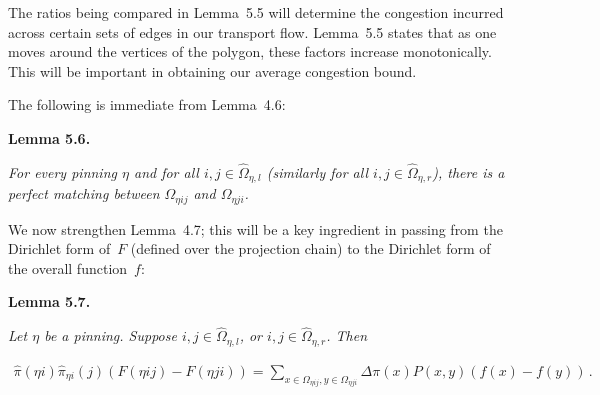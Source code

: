 The ratios being compared in Lemma 5.5 will determine the congestion incurred across certain sets of edges in our transport flow. Lemma 5.5 states that as one moves around the vertices of the polygon, these factors increase monotonically. This will be important in obtaining our average congestion bound.\par




The following is immediate from Lemma 4.6:\par





\par\medskip\noindent\textbf{\textbf{Lemma 5.6}\textbf{.}}\par



\emph{For every pinning $\eta$ and for all $i,j\in\hat{\Omega}_{\eta,l}$ (similarly for all $i,j\in\hat{\Omega}_{\eta,r}$), there is a perfect matching between $\Omega_{\eta ij}$ and $\Omega_{\eta ji}$.}\par






We now strengthen Lemma 4.7; this will be a key ingredient in passing from the Dirichlet form of $F$ (defined over the projection chain) to the Dirichlet form of the overall function $f$:\par





\par\medskip\noindent\textbf{\textbf{Lemma 5.7}\textbf{.}}\par



\emph{Let $\eta$ be a pinning. Suppose $i,j\in\hat{\Omega}_{\eta,l}$, or $i,j\in\hat{\Omega}_{\eta,r}$. Then}\par


\[\begin{gathered}
\displaystyle\hat{\pi}(\eta i)\hat{\pi}_{\eta i}(j)(F(\eta ij)-F(\eta ji)) \displaystyle=\sum_{x\in\Omega_{\eta ij},y\in\Omega_{\eta ji}}\Delta\pi(x)P(x,y)(f(x)-f(y))\,.
\end{gathered}\]






